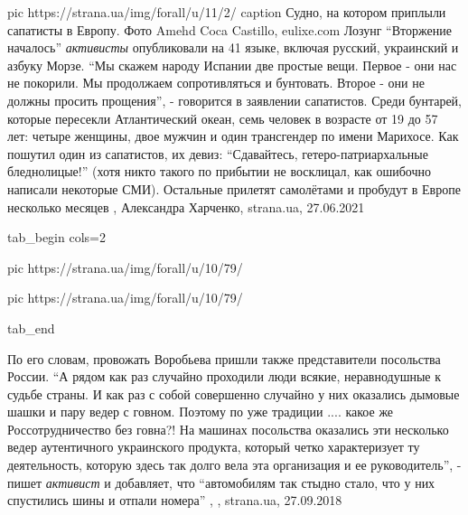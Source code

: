 \ifcmt
  pic https://strana.ua/img/forall/u/11/2/%
	caption Судно, на котором приплыли сапатисты в Европу. Фото Amehd Coca Castillo, eulixe.com
\fi
Лозунг \enquote{Вторжение началось} \emph{активисты} опубликовали на 41 языке, включая
русский, украинский и азбуку Морзе.  \enquote{Мы скажем народу Испании две простые
вещи. Первое - они нас не покорили. Мы продолжаем сопротивляться и бунтовать.
Второе - они не должны просить прощения}, - говорится в заявлении сапатистов.
Среди бунтарей, которые пересекли Атлантический океан, семь человек в возрасте
от 19 до 57 лет: четыре женщины, двое мужчин и один трансгендер по имени
Марихосе. Как пошутил один из сапатистов, их девиз: \enquote{Сдавайтесь,
гетеро-патриархальные бледнолицые!} (хотя никто такого по прибытии не
восклицал, как ошибочно написали некоторые СМИ).  Остальные прилетят самолётами
и пробудут в Европе несколько месяцев
, 
Александра Харченко, strana.ua, 27.06.2021


\ifcmt
  tab_begin cols=2

     pic https://strana.ua/img/forall/u/10/79/%

     pic https://strana.ua/img/forall/u/10/79/%

  tab_end
\fi

По его словам, провожать Воробьева пришли также представители посольства
России.  \enquote{А рядом как раз случайно проходили люди всякие, неравнодушные к
судьбе страны. И как раз с собой совершенно случайно у них оказались дымовые
шашки и пару ведер с говном. Поэтому по уже традиции .... какое же
Россотрудничество без говна?! На машинах посольства оказались эти несколько
ведер аутентичного украинского продукта, который четко характеризует ту
деятельность, которую здесь так долго вела эта организация и ее руководитель},
- пишет \emph{активист} и добавляет, что \enquote{автомобилям так стыдно стало, что у них
спустились шины и отпали номера}
, 
, strana.ua, 27.09.2018

